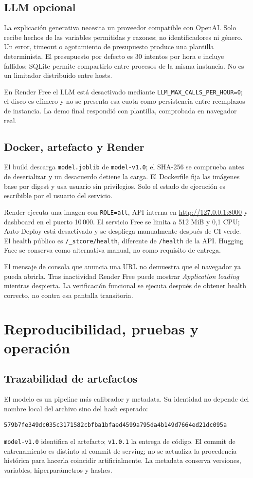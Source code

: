 \documentclass[11pt,a4paper,oneside]{report}
\begin{document}
\section{LLM opcional}
La explicación generativa necesita un proveedor compatible con OpenAI. Solo
recibe hechos de las variables permitidas y razones; no identificadores ni
género. Un error, timeout o agotamiento de presupuesto produce una plantilla
determinista. El presupuesto por defecto es 30 intentos por hora e incluye
fallidos; SQLite permite compartirlo entre procesos de la misma instancia.
No es un limitador distribuido entre hosts.

En Render Free el LLM está desactivado mediante
\texttt{LLM\_MAX\_CALLS\_PER\_HOUR=0}; el disco es efímero y no se presenta
esa cuota como persistencia entre reemplazos de instancia. La demo final
respondió con plantilla, comprobada en navegador real.

\section{Docker, artefacto y Render}
El build descarga \texttt{model.joblib} de \texttt{model-v1.0}; el SHA-256
se comprueba antes de deserializar y un desacuerdo detiene la carga. El
Dockerfile fija las imágenes base por digest y usa usuario sin privilegios.
Solo el estado de ejecución es escribible por el usuario del servicio.

Render ejecuta una imagen con \texttt{ROLE=all}, API interna en
\url{http://127.0.0.1:8000} y dashboard en el puerto 10\,000. El servicio
Free se limita a 512 MiB y 0,1 CPU; Auto-Deploy está desactivado y se despliega
manualmente después de CI verde. El health público es
\texttt{/\_stcore/health}, diferente de \texttt{/health} de la API.
Hugging Face se conserva como alternativa manual, no como requisito de entrega.

El mensaje de consola que anuncia una URL no demuestra que el navegador ya
pueda abrirla. Tras inactividad Render Free puede mostrar
\textit{Application loading} mientras despierta. La verificación funcional
se ejecuta después de obtener health correcto, no contra esa pantalla transitoria.

\chapter{Reproducibilidad, pruebas y operación}
\section{Trazabilidad de artefactos}
El modelo es un pipeline más calibrador y metadata. Su identidad no depende
del nombre local del archivo sino del hash esperado:
\begin{lstlisting}
579b7fe349dc035c3171582cbfba1bfaed4599a795da4b149d7664ed21dc095a
\end{lstlisting}
\texttt{model-v1.0} identifica el artefacto; \texttt{v1.0.1} la entrega de
código. El commit de entrenamiento es distinto al commit de serving; no se
actualiza la procedencia histórica para hacerla coincidir artificialmente.
La metadata conserva versiones, variables, hiperparámetros y hashes.
\end{document}
